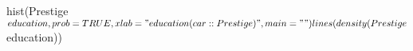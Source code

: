 \begin{Schunk}
\begin{Sinput}
 hist(Prestige$education, prob = TRUE,  xlab = "education (car::Prestige)", main = "")
 lines(density(Prestige$education))
\end{Sinput}
\end{Schunk}
